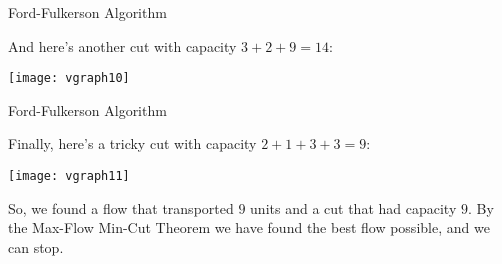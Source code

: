 \begin{frame}[fragile]{Ford-Fulkerson Algorithm}

And here's another cut with capacity $3+2+9=14$:

\begin{center}
\texttt{[image: vgraph10]}
\end{center}



\end{frame}
\begin{frame}[fragile]{Ford-Fulkerson Algorithm}

Finally, here's a tricky cut with capacity $2+1+3+3=9$:

\begin{center}
\texttt{[image: vgraph11]}
\end{center}

So, we found a flow that transported $9$ units and a cut that had capacity $9$.  By the Max-Flow Min-Cut Theorem we have found the best flow possible, and we can stop.



\end{frame}
